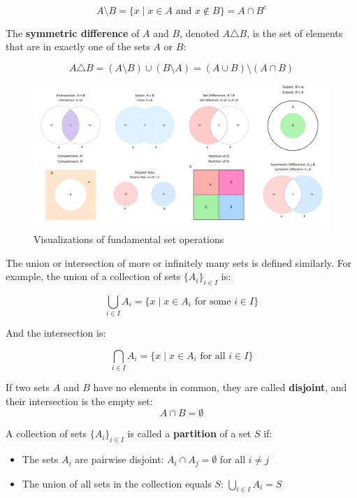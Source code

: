\[
A \setminus B = \{ x \mid x \in A \text{ and } x \notin B \} = A \cap B^c
\]

The \textbf{symmetric difference} of \( A \) and \( B \), denoted \( A \triangle B \), is the set of elements that are in exactly one of the sets \( A \) or \( B \):

\[
A \triangle B = (A \setminus B) \cup (B \setminus A) = (A \cup B) \setminus (A \cap B)
\]


\begin{figure}[h]
    \centering
    \includegraphics[width=\textwidth]{figures/set_operations/all_operations.png}
    \caption{Visualizations of fundamental set operations}\label{fig:set_operations}
\end{figure}

The union or intersection of more or infinitely many sets is defined similarly. For example, the union of a collection of sets \( \{A_i\}_{i \in I} \) is:

\[
\bigcup_{i \in I} A_i = \{ x \mid x \in A_i \text{ for some } i \in I \}
\]

And the intersection is:

\[
\bigcap_{i \in I} A_i = \{ x \mid x \in A_i \text{ for all } i \in I \}
\]

If two sets \( A \) and \( B \) have no elements in common, they are called \textbf{disjoint}, and their intersection is the empty set:
\[ A \cap B = \emptyset \]  

A collection of sets \( \{A_i\}_{i \in I} \) is called a \textbf{partition} of a set \( S \) if:
\begin{itemize}
    \item The sets \( A_i \) are pairwise disjoint: \( A_i \cap A_j = \emptyset \) for all \( i \neq j \)
    \item The union of all sets in the collection equals \( S \): \( \bigcup_{i \in I} A_i = S \)
\end{itemize}   

